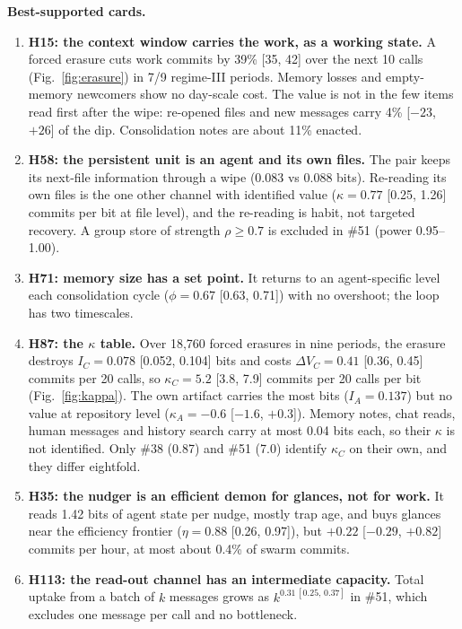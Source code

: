 \textbf{Best-supported cards.}
\begin{enumerate}
\item \textbf{H15: the context window carries the work, as a working state.} A forced erasure cuts work commits by 39\% [35, 42] over the next 10 calls (Fig.~\ref{fig:erasure}) in 7/9 regime-III periods. Memory losses and empty-memory newcomers show no day-scale cost. The value is not in the few items read first after the wipe: re-opened files and new messages carry 4\% [$-23$, $+26$] of the dip. Consolidation notes are about 11\% enacted.
\item \textbf{H58: the persistent unit is an agent and its own files.} The pair keeps its next-file information through a wipe (0.083 vs 0.088 bits). Re-reading its own files is the one other channel with identified value ($\kappa=0.77$ [0.25, 1.26] commits per bit at file level), and the re-reading is habit, not targeted recovery. A group store of strength $\rho\ge0.7$ is excluded in \#51 (power 0.95--1.00).
\item \textbf{H71: memory size has a set point.} It returns to an agent-specific level each consolidation cycle ($\phi=0.67$ [0.63, 0.71]) with no overshoot; the loop has two timescales.
\item \textbf{H87: the $\kappa$ table.} Over 18,760 forced erasures in nine periods, the erasure destroys $I_C=0.078$ [0.052, 0.104] bits and costs $\Delta V_C=0.41$ [0.36, 0.45] commits per 20 calls, so $\kappa_C=5.2$ [3.8, 7.9] commits per 20 calls per bit (Fig.~\ref{fig:kappa}). The own artifact carries the most bits ($I_A=0.137$) but no value at repository level ($\kappa_A=-0.6$ [$-1.6$, $+0.3$]). Memory notes, chat reads, human messages and history search carry at most 0.04 bits each, so their $\kappa$ is not identified. Only \#38 (0.87) and \#51 (7.0) identify $\kappa_C$ on their own, and they differ eightfold.
\item \textbf{H35: the nudger is an efficient demon for glances, not for work.} It reads 1.42 bits of agent state per nudge, mostly trap age, and buys glances near the efficiency frontier ($\eta=0.88$ [0.26, 0.97]), but $+0.22$ [$-0.29$, $+0.82$] commits per hour, at most about 0.4\% of swarm commits.
\item \textbf{H113: the read-out channel has an intermediate capacity.} Total uptake from a batch of $k$ messages grows as $k^{0.31\,[0.25,\,0.37]}$ in \#51, which excludes one message per call and no bottleneck.
\end{enumerate}


